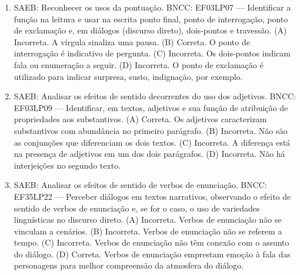 \begin{enumerate}
\item
SAEB: Reconhecer os usos da pontuação. 
BNCC: EF03LP07 --- Identificar a função na leitura e usar na escrita ponto final, ponto de interrogação, ponto de exclamação e, em diálogos (discurso direto), dois-pontos e travessão. 
(A) Incorreta. A vírgula sinaliza uma pausa. 
(B) Correta. O ponto de interrogação é indicativo de pergunta. 
(C) Incorreta. Os dois-pontos indicam fala ou enumeração a seguir. 
(D) Incorreta. O ponto de exclamação é utilizado para indicar surpresa, susto, indignação, por exemplo.

\item
SAEB: Analisar os efeitos de sentido decorrentes do uso dos adjetivos. 
BNCC: EF03LP09 --- Identificar, em textos, adjetivos e sua função de atribuição de propriedades aos substantivos. 
(A) Correta. Os adjetivos caracterizam substantivos com abundância no primeiro parágrafo. 
(B) Incorreta. Não são as conjunções que diferenciam os dois textos. 
(C) Incorreta. A diferença está na presença de adjetivos em um dos dois parágrafos. 
(D) Incorreta. Não há interjeições no segundo texto.

\item
SAEB: Analisar os efeitos de sentido de verbos de enunciação. 
BNCC: EF35LP22 --- Perceber diálogos em textos narrativos, observando o efeito de sentido de verbos de enunciação e, se for o caso, o uso de variedades linguísticas no discurso direto. 
(A) Incorreta. Verbos de enunciação não se vinculam a cenários. 
(B) Incorreta. Verbos de enunciação não se referem a tempo. 
(C) Incorreta. Verbos de enunciação não têm conexão com o assunto do diálogo. 
(D) Correta. Verbos de enunciação emprestam emoção à fala das personagens para melhor compreensão da atmosfera do diálogo.
\end{enumerate}
